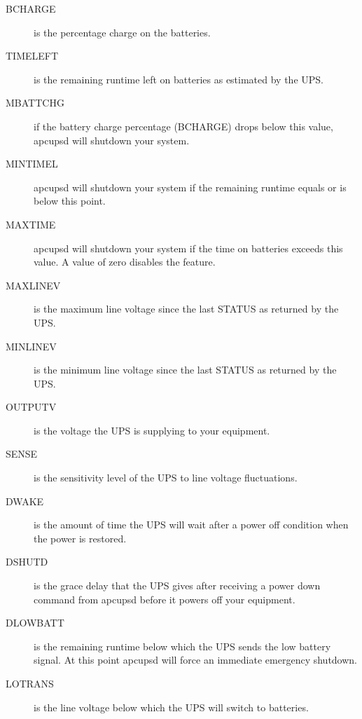 {{{{{{{{\begin{description}
\item [BCHARGE]
   is the percentage charge on the batteries.  

\item [TIMELEFT]
   is the remaining runtime left on batteries as estimated by the UPS.  

\item [MBATTCHG]
   if the battery charge percentage (BCHARGE) drops below this value, apcupsd
will shutdown your system.  

\item [MINTIMEL]
   apcupsd will shutdown your system if the remaining runtime equals or is below
this point.  

\item [MAXTIME]
   apcupsd will shutdown your system if the time on batteries exceeds this value.
A value of zero disables the feature.  

\item [MAXLINEV]
   is the maximum line voltage since the last STATUS as returned by the UPS.  

\item [MINLINEV]
   is the minimum line voltage since the last STATUS as returned by the UPS.  

\item [OUTPUTV]
   is the voltage the UPS is supplying to your equipment.  

\item [SENSE]
   is the sensitivity level of the UPS to line voltage fluctuations.  

\item [DWAKE]
   is the amount of time the UPS will wait after a power off condition when the
power is restored.  

\item [DSHUTD]
   is the grace delay that the UPS gives after receiving a power down command
from apcupsd before it powers off your equipment.  

\item [DLOWBATT]
   is the remaining runtime below which the UPS sends the low battery signal. At
this point apcupsd will force an immediate emergency shutdown.  

\item [LOTRANS]
   is the line voltage below which the UPS will switch to batteries.  


\end{description}}}}}}}}}
